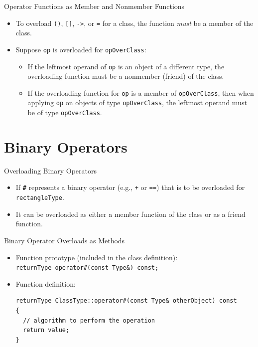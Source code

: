 \documentclass[14pt,aspectratio=1610, hyperref={pdfpagelayout=SinglePage}]{beamer}
\begin{document}
\begin{frame}[fragile]{Operator Functions as Member and Nonmember
Functions}
\protect\hypertarget{operator-functions-as-member-and-nonmember-functions}{}
\begin{itemize}
\item
  To overload \lstinline{()}, \lstinline{[]},
  \lstinline{->}, or \lstinline{=} for a class,
  the function \textit{must} be a member of the class.
\item
  Suppose \lstinline{op} is overloaded for \lstinline{opOverClass}:
  \begin{itemize}
  \item
    If the leftmost operand of \lstinline{op} is an object of a different
    type, the overloading function must be a nonmember (friend) of the
    class.
  \item
    If the overloading function for \lstinline{op} is a member of
    \lstinline{opOverClass}, then when applying \lstinline{op} on objects of
    type \lstinline{opOverClass}, the leftmost operand must be of type
    \lstinline{opOverClass}.
  \end{itemize}
\end{itemize}
\end{frame}

\section{Binary Operators}

\begin{frame}[fragile]{Overloading Binary Operators}
\protect\hypertarget{overloading-binary-operators}{}
\begin{itemize}
\item
  If \texttt{\textbf{\#}} represents a binary operator (e.g.,
  \lstinline{+} or \lstinline{==}) that is to be overloaded for \lstinline{rectangleType}.
\item
  It can be overloaded as either a member function of the class or as a
  friend function.
\end{itemize}
\end{frame}

\begin{frame}[fragile]{Binary Operator Overloads as Methods}
\protect\hypertarget{overloading-the-binary-operators-as-member-functions}{}
\begin{itemize}
\item
  Function prototype (included in the class definition):\\
  \lstinline{returnType operator#(const Type&) const;}
\item
  Function definition:\\
  \begin{lstlisting}[basicstyle=\ttfamily\small]
returnType ClassType::operator#(const Type& otherObject) const
{
  // algorithm to perform the operation
  return value;
}
\end{lstlisting}
\end{itemize}
\end{frame}
\end{document}
